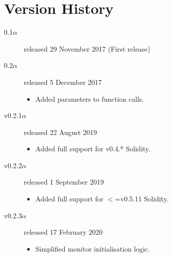 \documentclass{article}
\begin{document}
  \section{Version History}
\begin{description}
\item[0.1$\alpha$] released 29 November 2017 (First release)
\item[0.2$\alpha$] released 5 December 2017
\begin{itemize}
  \item Added parameters to function calls.
\end{itemize}
\item[v0.2.1$\alpha$] released 22 August 2019
\begin{itemize}
  \item Added full support for v0.4.* Solidity.
\end{itemize}
\item[v0.2.2$\alpha$] released 1 September 2019
\begin{itemize}
  \item Added full support for $<$=v0.5.11 Solidity.
\end{itemize}
\item[v0.2.3$\alpha$] released 17 February 2020
\begin{itemize}
  \item Simplified monitor initialisation logic.
\end{itemize}
\end{description}

  
\end{document}
